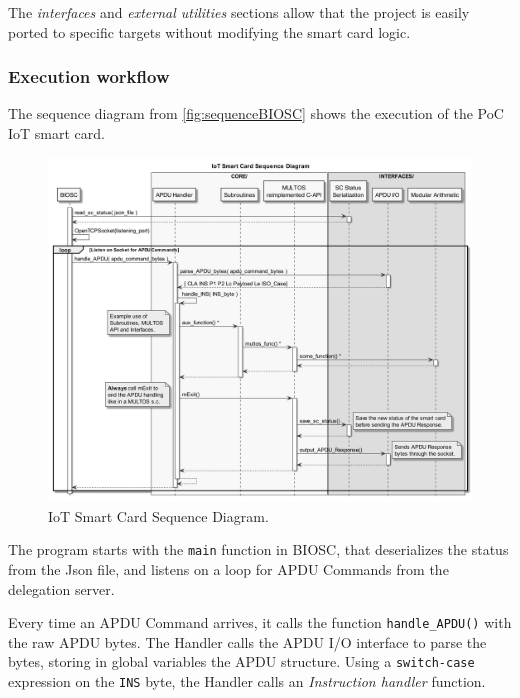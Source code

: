 \documentclass[journal]{IEEEtran}
\begin{document}
\hfil

The \textit{interfaces} and \textit{external utilities} sections  allow that the project is easily ported to specific targets without modifying the smart card logic.



\subsubsection{Execution workflow}

The sequence diagram from \autoref{fig:sequenceBIOSC} shows the execution of the PoC IoT smart card.



\begin{figure}[bth]
	\begin{center}
		\includegraphics[width=\linewidth]{gfx/UML/sequenceBIOSC}
	\end{center}
	\caption{IoT Smart Card Sequence Diagram.}
	\label{fig:sequenceBIOSC}
\end{figure}



The program starts with the \texttt{main} function in BIOSC, that deserializes the status from the Json file, and listens on a loop for APDU Commands from the delegation server.

Every time an APDU Command arrives, it calls the function \texttt{handle\_APDU()} with the raw APDU bytes. The Handler calls the APDU I/O interface to parse the bytes, storing in global variables the APDU structure. Using a \texttt{switch-case} expression on the \texttt{INS} byte, the Handler calls an \textit{Instruction handler} function.
\end{document}
